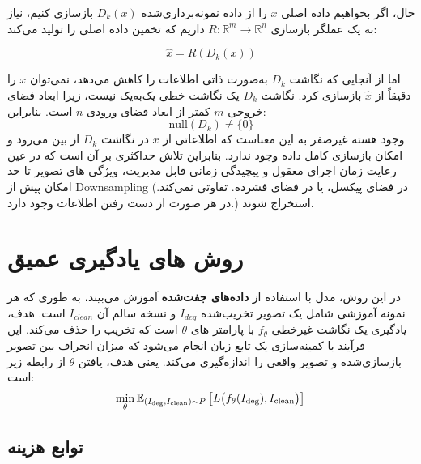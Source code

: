 حال، اگر بخواهیم داده اصلی \( x \) را از داده نمونه‌برداری‌شده \( D_k(x) \) بازسازی کنیم، نیاز به یک عملگر بازسازی \( R: \mathbb{R}^m \to \mathbb{R}^n \) داریم که تخمین داده اصلی را تولید می‌کند:

\[
\hat{x} = R(D_k(x))
\]

اما از آنجایی که نگاشت \( D_k \) به‌صورت ذاتی اطلاعات را کاهش می‌دهد، نمی‌توان \( x \) را دقیقاً از \( \hat{x} \) بازسازی کرد. نگاشت \( D_k \) یک نگاشت خطی یک‌به‌یک نیست، زیرا ابعاد فضای خروجی \( m \) کمتر از ابعاد فضای ورودی \( n \) است. بنابراین:
\[
\text{null}(D_k) \neq \{0\}
\]
وجود هسته غیرصفر به این معناست که اطلاعاتی از \( x \) در نگاشت \( D_k \) از بین می‌رود و امکان بازسازی کامل داده وجود ندارد. بنابراین تلاش حداکثری بر آن است که در عین رعایت زمان اجرای معقول و پیچیدگی زمانی قابل مدیریت، ویژگی های تصویر تا حد امکان پیش از Downsampling (در فضای پیکسل، یا در فضای فشرده. تفاوتی نمی‌کند. در هر صورت از دست رفتن اطلاعات وجود دارد.) استخراج شوند.





\section{روش های یادگیری عمیق}


در این روش، مدل با استفاده از \textbf{داده‌های جفت‌شده} آموزش می‌بیند، به طوری که هر نمونه آموزشی شامل یک تصویر تخریب‌شده $ I_{deg} $ و نسخه سالم آن $ I_{clean} $  است. هدف، یادگیری یک نگاشت غیرخطی $ f_{\theta} $  با پارامتر های $\theta $ است که تخریب را حذف می‌کند. این فرآیند با کمینه‌سازی یک تابع زیان انجام می‌شود
که میزان انحراف بین تصویر بازسازی‌شده و تصویر واقعی را اندازه‌گیری می‌کند. یعنی هدف، یافتن $\theta$ از رابطه زیر است:
\begin{equation}
	\min_{\theta} \mathbb{E}_{(I_{\text{deg}}, I_{\text{clean}}) \sim P} \left[ L\big( f_{\theta}(I_{\text{deg}}), I_{\text{clean}} \big) \right] \\
\end{equation}


\subsection{توابع هزینه}

